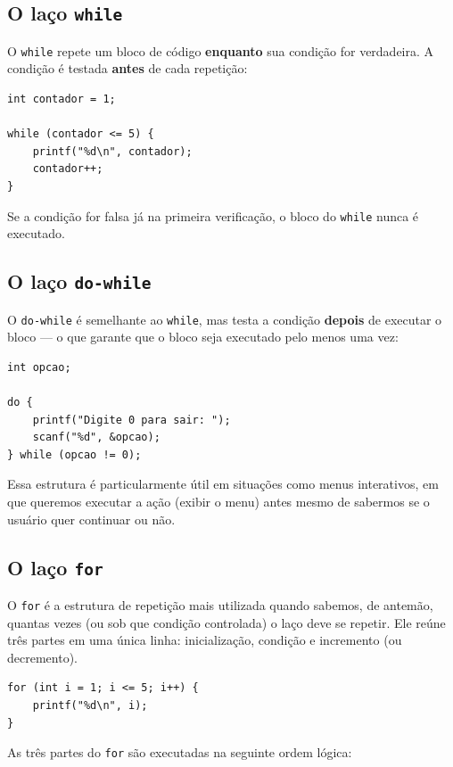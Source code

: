 \documentclass[12pt,a4paper,oneside]{extreport}
\begin{document}
\subsection{O laço \texttt{while}}

O \texttt{while} repete um bloco de código \textbf{enquanto} sua condição for verdadeira. A condição é testada \textbf{antes} de cada repetição:

\begin{lstlisting}
int contador = 1;

while (contador <= 5) {
    printf("%d\n", contador);
    contador++;
}
\end{lstlisting}

Se a condição for falsa já na primeira verificação, o bloco do \texttt{while} nunca é executado.

\subsection{O laço \texttt{do-while}}

O \texttt{do-while} é semelhante ao \texttt{while}, mas testa a condição \textbf{depois} de executar o bloco — o que garante que o bloco seja executado pelo menos uma vez:

\begin{lstlisting}
int opcao;

do {
    printf("Digite 0 para sair: ");
    scanf("%d", &opcao);
} while (opcao != 0);
\end{lstlisting}

Essa estrutura é particularmente útil em situações como menus interativos, em que queremos executar a ação (exibir o menu) antes mesmo de sabermos se o usuário quer continuar ou não.

\subsection{O laço \texttt{for}}

O \texttt{for} é a estrutura de repetição mais utilizada quando sabemos, de antemão, quantas vezes (ou sob que condição controlada) o laço deve se repetir. Ele reúne três partes em uma única linha: inicialização, condição e incremento (ou decremento).

\begin{lstlisting}
for (int i = 1; i <= 5; i++) {
    printf("%d\n", i);
}
\end{lstlisting}

As três partes do \texttt{for} são executadas na seguinte ordem lógica:
\end{document}
